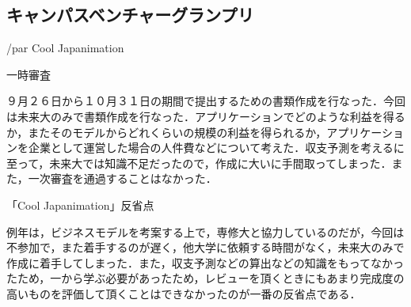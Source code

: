\subsection{キャンパスベンチャーグランプリ}
/par
Cool Japanimation
\par
一時審査
\par
９月２６日から１０月３１日の期間で提出するための書類作成を行なった．今回は未来大のみで書類作成を行なった．アプリケーションでどのような利益を得るか，またそのモデルからどれくらいの規模の利益を得られるか，アプリケーションを企業として運営した場合の人件費などについて考えた．収支予測を考えるに至って，未来大では知識不足だったので，作成に大いに手間取ってしまった．また，一次審査を通過することはなかった．
\\
\par
「Cool Japanimation」反省点
\par
例年は，ビジネスモデルを考案する上で，専修大と協力しているのだが，今回は不参加で，また着手するのが遅く，他大学に依頼する時間がなく，未来大のみで作成に着手してしまった．また，収支予測などの算出などの知識をもってなかったため，一から学ぶ必要があったため，レビューを頂くときにもあまり完成度の高いものを評価して頂くことはできなかったのが一番の反省点である．
